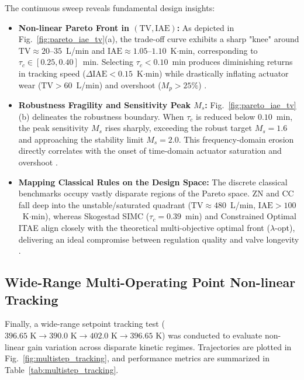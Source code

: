 

The continuous sweep reveals fundamental design insights:
\begin{itemize}
    \item \textbf{Non-linear Pareto Front in $(\text{TV}, \text{IAE})$:} As depicted in Fig.~\ref{fig:pareto_iae_tv}(a), the trade-off curve exhibits a sharp "knee" around $\text{TV} \approx 20\text{--}35$~L/min and $\text{IAE} \approx 1.05\text{--}1.10$~K$\cdot$min, corresponding to $\tau_c \in [0.25, 0.40]$~min. Selecting $\tau_c < 0.10$~min produces diminishing returns in tracking speed ($\Delta \text{IAE} < 0.15$~K$\cdot$min) while drastically inflating actuator wear ($\text{TV} > 60$~L/min) and overshoot ($M_p > 25\%$) \cite{grimholt2018optimal, alcantara2013simple}.
    
    \item \textbf{Robustness Fragility and Sensitivity Peak $M_s$:} Fig.~\ref{fig:pareto_iae_tv}(b) delineates the robustness boundary. When $\tau_c$ is reduced below $0.10$~min, the peak sensitivity $M_s$ rises sharply, exceeding the robust target $M_s = 1.6$ and approaching the stability limit $M_s = 2.0$. This frequency-domain erosion directly correlates with the onset of time-domain actuator saturation and overshoot \cite{garpinger2014performance, padula2012optimal}.
    
    \item \textbf{Mapping Classical Rules on the Design Space:} The discrete classical benchmarks occupy vastly disparate regions of the Pareto space. ZN and CC fall deep into the unstable/saturated quadrant ($\text{TV} \approx 480$~L/min, $\text{IAE} > 100$~K$\cdot$min), whereas Skogestad SIMC ($\tau_c = 0.39$~min) and Constrained Optimal ITAE align closely with the theoretical multi-objective optimal front ($\lambda$-opt), delivering an ideal compromise between regulation quality and valve longevity \cite{reynoso2021multiobjective}.
\end{itemize}

\subsection{Wide-Range Multi-Operating Point Non-linear Tracking}
Finally, a wide-range setpoint tracking test ($396.65\text{ K} \rightarrow 390.0\text{ K} \rightarrow 402.0\text{ K} \rightarrow 396.65\text{ K}$) was conducted to evaluate non-linear gain variation across disparate kinetic regimes. Trajectories are plotted in Fig.~\ref{fig:multistep_tracking}, and performance metrics are summarized in Table~\ref{tab:multistep_tracking}.


